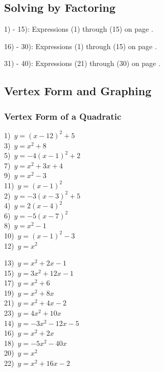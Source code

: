 \newpage

\subsection{Solving by Factoring}

{}\pp

1) - 15): Expressions (1) through (15) on page \pageref{ais1}.\pp

16) - 30): Expressions (1) through (15) on page \pageref{aisnot1}.\pp

31) - 40): Expressions (21) through (30) on page \pageref{aisnot1}.

\newpage

\subsection{Vertex Form and Graphing}

\subsubsection{Vertex Form of a Quadratic}

{}

\begin{multicols}{2}
  1)~$y=(x-12)^2+5 $\\
  3)~$y=x^2+8$\\
  5)~$y=-4(x-1)^2+2$\\
  7)~$y=x^2+3x+4$\\
  9)~$y=x^2-3$\\
  11)~$y=(x-1)^2$\\
  2)~$y=-3(x-3)^2+5 $\\
  4)~$y=2(x-4)^2 $\\
  6)~$y=-5(x-7)^2$\\
  8)~$y=x^2-1$\\
  10)~$y=(x-1)^2-3 $\\
  12)~$y=x^2$
\end{multicols}


{}

\begin{multicols}{2}
  13)~$y=x^2+2x-1 $\\
  15)~$y=3x^2+12x-1$\\
  17)~$y=x^2+6$\\
  19)~$y=x^2+8x$\\
  21)~$y=x^2+4x-2$\\
  23)~$y=4x^2+10x$\\
  14)~$y=-3x^2-12x-5 $\\
  16)~$y=x^2+2x$\\
  18)~$y=-5x^2-40x$\\
  20)~$y=x^2$\\
  22)~$y=x^2+16x-2 $
\end{multicols}

